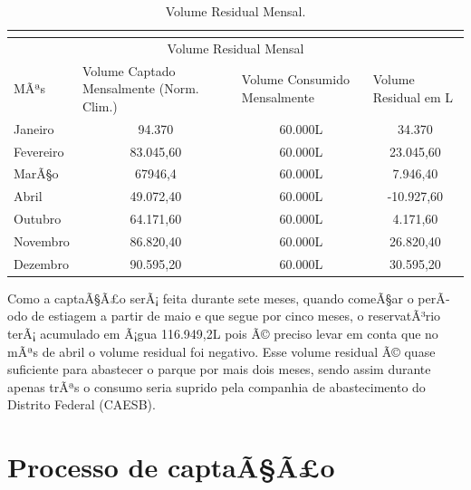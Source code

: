 \begin{table}[h]
\centering
\caption{Volume Residual Mensal.}
\label{Volume Residual Mensal.}
\begin{tabular}{lccc}
 & \multicolumn{1}{l}{} & \multicolumn{1}{l}{} & \multicolumn{1}{l}{} \\ \hline
\multicolumn{4}{|c|}{Volume Residual Mensal} \\ \hline
\multicolumn{1}{|l|}{MÃªs} & \multicolumn{1}{l|}{Volume Captado Mensalmente (Norm. Clim.)} & \multicolumn{1}{l|}{Volume Consumido Mensalmente} & \multicolumn{1}{l|}{Volume Residual em L} \\ \hline
\multicolumn{1}{|l|}{Janeiro} & \multicolumn{1}{c|}{94.370} & \multicolumn{1}{c|}{60.000L} & \multicolumn{1}{c|}{34.370} \\ \hline
\multicolumn{1}{|l|}{Fevereiro} & \multicolumn{1}{c|}{83.045,60} & \multicolumn{1}{c|}{60.000L} & \multicolumn{1}{c|}{23.045,60} \\ \hline
\multicolumn{1}{|l|}{MarÃ§o} & \multicolumn{1}{c|}{67946,4} & \multicolumn{1}{c|}{60.000L} & \multicolumn{1}{c|}{7.946,40} \\ \hline
\multicolumn{1}{|l|}{Abril} & \multicolumn{1}{c|}{49.072,40} & \multicolumn{1}{c|}{60.000L} & \multicolumn{1}{c|}{-10.927,60} \\ \hline
\multicolumn{1}{|l|}{Outubro} & \multicolumn{1}{c|}{64.171,60} & \multicolumn{1}{c|}{60.000L} & \multicolumn{1}{c|}{4.171,60} \\ \hline
\multicolumn{1}{|l|}{Novembro} & \multicolumn{1}{c|}{86.820,40} & \multicolumn{1}{c|}{60.000L} & \multicolumn{1}{c|}{26.820,40} \\ \hline
\multicolumn{1}{|l|}{Dezembro} & \multicolumn{1}{c|}{90.595,20} & \multicolumn{1}{c|}{60.000L} & \multicolumn{1}{c|}{30.595,20} \\ \hline
\end{tabular}
\end{table}

Como a captaÃ§Ã£o serÃ¡ feita durante sete meses, quando comeÃ§ar o perÃ­odo de estiagem a partir de maio e que segue por cinco meses, o reservatÃ³rio terÃ¡ acumulado em Ã¡gua 116.949,2L pois Ã© preciso levar em conta que no mÃªs de abril o volume residual foi negativo. Esse volume residual Ã© quase suficiente para abastecer o parque por mais dois meses, sendo assim durante apenas trÃªs o consumo seria suprido pela companhia de abastecimento do Distrito Federal (CAESB).

\section{Processo de captaÃ§Ã£o}

